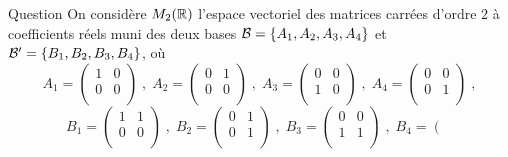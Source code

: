 \begin{multi}[multiple,feedback=
{\(P = \left(\begin{array}{rccc}
1&0&0&1\\
1&1&0&0\\ 
0&0&1&-1\\ 
0&1&1&0\\
\end{array}\right)\) et 
\(\displaystyle Q= \frac{1}{2}\left(\begin{array}{rccc}
1&1&1&-1\\
-1&1&-1&1\\ 
1&-1&1&1\\ 
1&-1&-1&1\\
\end{array}\right)\). Par définition, \(Q\) est la matrice de l'application identité de \(M_2(\Rr)\) de la base \({\cal {B}}\) à la base \({\cal {B'}}\).
}]{Question}
On considère \(M_2(\Rr)\) l'espace vectoriel des matrices carrées d'ordre \(2\) à coefficients réels muni des deux bases \({\cal {B}}= \{ A_1,A_2,A_3,A_4\}\) et \({\cal {B'}}= \{ B_1,B_2,B_3,B_4\}\), où
\[A_1 = \left(\begin{array}{rc}1&0\\0&0\\ \end{array}\right) \; , \; A_2 = \left(\begin{array}{rc}0&1\\
0&0\\ \end{array}\right) \; , \; A_3 = \left(\begin{array}{rc}
0&0\\
1&0\\ \end{array}\right) \; , \; A_4 = \left(\begin{array}{rc}
0&0\\0&1\\ \end{array}\right) \; , \]
\[ B_1 = \left(\begin{array}{rc}1&1\\
0&0\\ \end{array}\right) \; , \; B_2 = \left(\begin{array}{rc}
0&1\\0&1\\ \end{array}\right) \; , \; B_3 = \left(\begin{array}{rc}
0&0\\ 1&1\\ \end{array}\right) \; ,\; B_4 = \left(\begin{array}{rc}

\end{array}\]
\end{multi}
